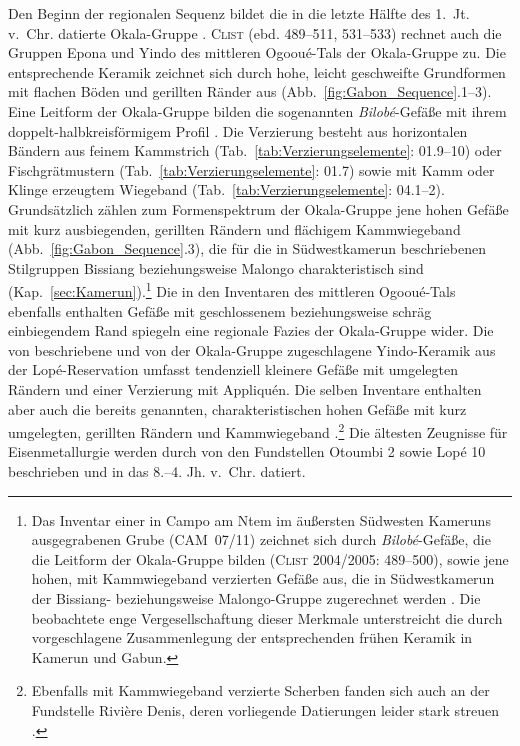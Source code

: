 Den Beginn der regionalen Sequenz bildet die in die letzte Hälfte des 1.~Jt. v.~Chr. datierte Okala-Gruppe \parencites{Clist.1988}{Clist.1997}[511]{Clist.20042005}. \textsc{Clist} (ebd. 489--511, 531--533) rechnet auch die Gruppen Epona \parencites{Oslisly.1992}{Oslisly.199495}{Oslisly.1998}{Oslisly.2001b}{Oslisly.1992b} und Yindo \parencites{AssokoNdong.20002001}{AssokoNdong.2002} des mittleren Ogooué-Tals der Okala-Gruppe zu. Die entsprechende Keramik zeichnet sich durch hohe, leicht geschweifte Grundformen mit flachen Böden und gerillten Ränder aus (Abb.~\ref{fig:Gabon_Sequence}.1--3). Eine Leitform der Okala-Gruppe bilden die sogenannten \textit{Bilobé}-Gefäße mit ihrem doppelt-halbkreisförmigem Profil \parencite[siehe][161 Abb.~3.3--4, 163 Anm.~3]{Seidensticker.2010c}. Die Verzierung besteht aus horizontalen Bändern aus feinem Kammstrich (Tab.~\ref{tab:Verzierungselemente}: 01.9--10) oder Fischgrätmustern (Tab.~\ref{tab:Verzierungselemente}: 01.7) sowie mit Kamm oder Klinge erzeugtem Wiegeband (Tab.~\ref{tab:Verzierungselemente}: 04.1--2). Grundsätzlich zählen zum Formenspektrum der Okala-Gruppe jene hohen Gefäße mit kurz ausbiegenden, gerillten Rändern und flächigem Kammwiegeband (Abb.~\ref{fig:Gabon_Sequence}.3), die für die in Südwestkamerun beschriebenen Stilgruppen Bissiang beziehungsweise Malongo charakteristisch sind (Kap.~\ref{sec:Kamerun}).\footnote{Das Inventar einer in Campo am Ntem im äußersten Südwesten Kameruns ausgegrabenen Grube (CAM~07/11) zeichnet sich durch \textit{Bilobé}-Gefäße, die die Leitform der Okala-Gruppe bilden (\textsc{Clist} 2004/2005: 489--500), sowie jene hohen, mit Kammwiegeband verzierten Gefäße aus, die in Südwestkamerun der Bissiang- beziehungsweise Malongo-Gruppe zugerechnet werden \parencites[330--341]{GouemGouem.20102011}[233--249]{NlendNlend.20132014}. Die beobachtete enge Vergesellschaftung dieser Merkmale unterstreicht die durch \textcites[632 Abb.~43.3]{deMaret.2013}[249 Abb.~113]{NlendNlend.20132014} vorgeschlagene Zusammenlegung der entsprechenden frühen Keramik in Kamerun und Gabun.} Die in den Inventaren des mittleren Ogooué-Tals ebenfalls enthalten Gefäße mit geschlossenem beziehungsweise schräg einbiegendem Rand \parencite[siehe][99 Abb.~5.B]{Oslisly.1998} spiegeln eine regionale Fazies der Okala-Gruppe wider. Die von \textcites{AssokoNdong.20002001}[142 Abb.~4]{AssokoNdong.2002} beschriebene und von \textcite[531--533]{Clist.20042005} der Okala-Gruppe zugeschlagene Yindo-Keramik aus der Lopé-Reservation umfasst tendenziell kleinere Gefäße mit umgelegten Rändern und einer Verzierung mit Appliquén. Die selben Inventare enthalten aber auch die bereits genannten, charakteristischen hohen Gefäße mit kurz umgelegten, gerillten Rändern und Kammwiegeband \parencite[186 Taf.~11,R.6]{AssokoNdong.20002001}.\footnote{Ebenfalls mit Kammwiegeband verzierte Scherben fanden sich auch an der Fundstelle Rivière Denis, deren vorliegende Datierungen leider stark streuen \parencite[438, 441 Abb.~6-187, 447 Abb.~6-194]{Clist.20042005}.} Die ältesten Zeugnisse für Eisenmetallurgie werden durch \textcite[202]{Oslisly.1992} von den Fundstellen Otoumbi 2 sowie Lopé 10 beschrieben und in das 8.--4. Jh. v.~Chr. datiert.

